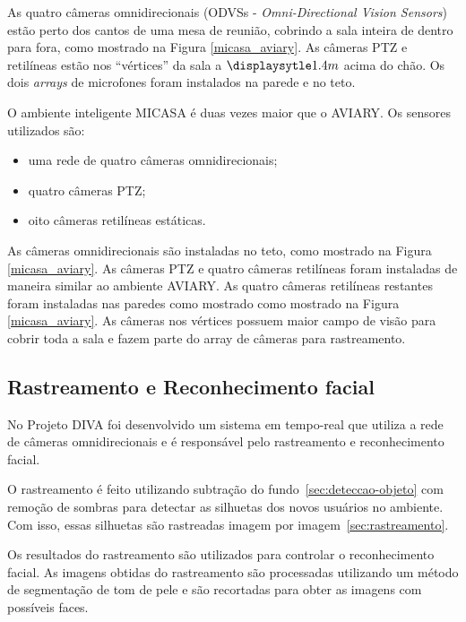 As quatro câmeras omnidirecionais (ODVSs - \textit{Omni-Directional Vision Sensors}) estão perto dos cantos de uma mesa de reunião, cobrindo a sala inteira de dentro para fora, como mostrado na Figura \ref{micasa_aviary}. As câmeras PTZ e retilíneas estão nos ``vértices'' da sala a $\displaysytle 1.4m$ acima do chão. Os dois \textit{arrays} de microfones foram instalados na parede e no teto.


O ambiente inteligente MICASA é duas vezes maior que o AVIARY. Os sensores utilizados são:
	
	\begin{itemize}
		\item uma rede de quatro câmeras omnidirecionais;
		\item quatro câmeras PTZ;
		\item oito câmeras retilíneas estáticas.
	\end{itemize}

As câmeras omnidirecionais são instaladas no teto, como mostrado na Figura \ref{micasa_aviary}. As câmeras PTZ e quatro câmeras retilíneas foram instaladas de maneira similar ao ambiente AVIARY. As quatro câmeras retilíneas restantes foram instaladas nas paredes como mostrado como mostrado na Figura \ref{micasa_aviary}. As câmeras nos vértices possuem maior campo de visão para cobrir toda a sala e fazem parte do array de câmeras para rastreamento.

\subsection{Rastreamento e Reconhecimento facial}
 
No Projeto DIVA foi desenvolvido um sistema em tempo-real que utiliza a rede de câmeras omnidirecionais e é responsável pelo rastreamento e reconhecimento facial. 

O rastreamento é feito utilizando subtração do fundo~\ref{sec:deteccao-objeto} com remoção de sombras para detectar as silhuetas dos novos usuários no ambiente.  Com isso, essas silhuetas são rastreadas imagem por imagem~\ref{sec:rastreamento}.

Os resultados do rastreamento são utilizados para controlar o reconhecimento facial. As imagens obtidas do rastreamento são processadas utilizando um método de segmentação de tom de pele e são recortadas para obter as imagens com possíveis faces. 

